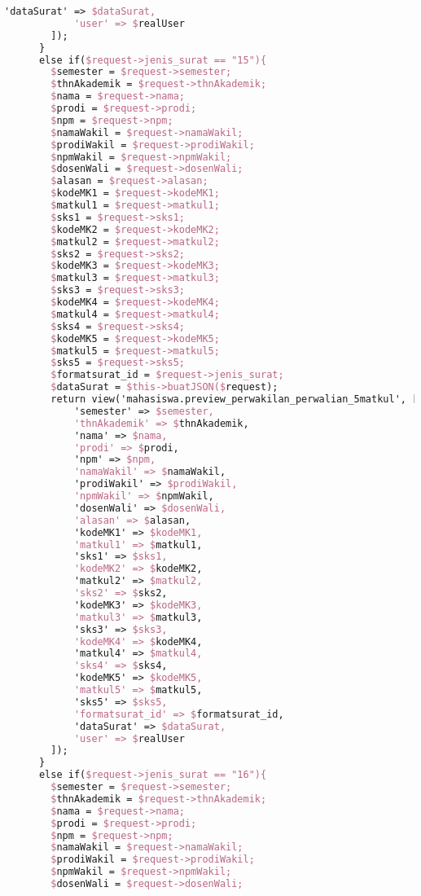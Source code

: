 \begin{lstlisting}[language=tex,basicstyle=\tiny,caption=PesanansuratController.php]
            'dataSurat' => $dataSurat,
            'user' => $realUser
        ]);
      }
      else if($request->jenis_surat == "15"){
        $semester = $request->semester;
        $thnAkademik = $request->thnAkademik;
        $nama = $request->nama;
        $prodi = $request->prodi;
        $npm = $request->npm;
        $namaWakil = $request->namaWakil;
        $prodiWakil = $request->prodiWakil;
        $npmWakil = $request->npmWakil;
        $dosenWali = $request->dosenWali;
        $alasan = $request->alasan;
        $kodeMK1 = $request->kodeMK1;
        $matkul1 = $request->matkul1;
        $sks1 = $request->sks1;
        $kodeMK2 = $request->kodeMK2;
        $matkul2 = $request->matkul2;
        $sks2 = $request->sks2;
        $kodeMK3 = $request->kodeMK3;
        $matkul3 = $request->matkul3;
        $sks3 = $request->sks3;
        $kodeMK4 = $request->kodeMK4;
        $matkul4 = $request->matkul4;
        $sks4 = $request->sks4;
        $kodeMK5 = $request->kodeMK5;
        $matkul5 = $request->matkul5;
        $sks5 = $request->sks5;
        $formatsurat_id = $request->jenis_surat;
        $dataSurat = $this->buatJSON($request);
        return view('mahasiswa.preview_perwakilan_perwalian_5matkul', [
            'semester' => $semester,
            'thnAkademik' => $thnAkademik,
            'nama' => $nama,
            'prodi' => $prodi,
            'npm' => $npm,
            'namaWakil' => $namaWakil,
            'prodiWakil' => $prodiWakil,
            'npmWakil' => $npmWakil,
            'dosenWali' => $dosenWali,
            'alasan' => $alasan,
            'kodeMK1' => $kodeMK1,
            'matkul1' => $matkul1,
            'sks1' => $sks1,
            'kodeMK2' => $kodeMK2,
            'matkul2' => $matkul2,
            'sks2' => $sks2,
            'kodeMK3' => $kodeMK3,
            'matkul3' => $matkul3,
            'sks3' => $sks3,
            'kodeMK4' => $kodeMK4,
            'matkul4' => $matkul4,
            'sks4' => $sks4,
            'kodeMK5' => $kodeMK5,
            'matkul5' => $matkul5,
            'sks5' => $sks5,
            'formatsurat_id' => $formatsurat_id,
            'dataSurat' => $dataSurat,
            'user' => $realUser
        ]);
      }
      else if($request->jenis_surat == "16"){
        $semester = $request->semester;
        $thnAkademik = $request->thnAkademik;
        $nama = $request->nama;
        $prodi = $request->prodi;
        $npm = $request->npm;
        $namaWakil = $request->namaWakil;
        $prodiWakil = $request->prodiWakil;
        $npmWakil = $request->npmWakil;
        $dosenWali = $request->dosenWali;

\end{lstlisting}
